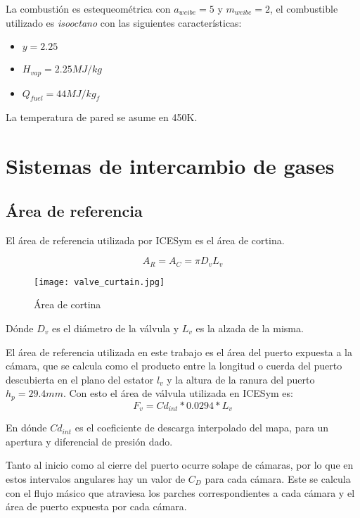 La combustión es estequeométrica con $a_{weibe}=5$ y $m_{weibe}=2$, el combustible utilizado
es \emph{isooctano} con las siguientes características:
\begin{itemize}
    \item $y = 2.25$
    \item $H_{vap} = 2.25 MJ/kg$
    \item $Q_{fuel} = 44 MJ/kg_f$
\end{itemize}

La temperatura de pared se asume en 450K.


\section{Sistemas de intercambio de gases}
%
\subsection{Área de referencia}
%
El área de referencia utilizada por ICESym es el área de cortina.

\begin{equation}
  \label{eq:Ar}
  A_R = A_C = \pi D_v L_v
\end{equation}

\begin{figure}
  \centering
  \texttt{[image: valve\_curtain.jpg]}
  \caption{Área de cortina}\label{fig:area_cortina}
\end{figure}

Dónde $D_v$ es el diámetro de la válvula y $L_v$ es la alzada de la misma.

El área de referencia utilizada en este trabajo es el área del puerto expuesta a
la cámara, que se calcula como el producto entre la longitud o cuerda del puerto
descubierta en el plano del estator $l_v$ y la altura de la ranura del puerto
$h_p=29.4mm$.
%
Con esto el área de válvula utilizada en ICESym es:
\begin{equation}
  \label{eq:fv}
  F_v = Cd_{int}*0.0294*L_v
\end{equation}

En dónde $Cd_{int}$ es el coeficiente de descarga interpolado del mapa, para un apertura
y diferencial de presión dado.


%
Tanto al inicio como al cierre del puerto ocurre solape de cámaras, por lo que
en estos intervalos angulares hay un valor de $C_D$ para cada cámara.
%
Este se calcula con el flujo másico que atraviesa los parches correspondientes
a cada cámara y el área de puerto expuesta por cada cámara.

